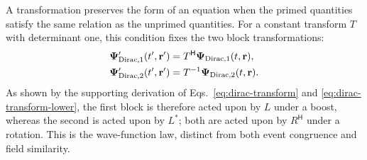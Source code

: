 \documentclass[10pt,letterpaper]{article}
\let\STAamsmathtext\text
\newcommand{\eqtext}[1]{\STAamsmathtext{\normalfont\rmfamily #1}}
\renewcommand{\text}[1]{\STAamsmathtext{\normalfont\rmfamily #1}}
\newcommand{\pv}[1]{#1}
\newcommand{\vct}[1]{\mathbf{#1}}
\newcommand{\bPsi}{\pv{\bm{\Psi}}}
\newcommand{\Hop}{\mathsf H}
\newcommand{\conj}[1]{#1^{*}}
\begin{document}
A transformation preserves the form of an equation when the primed
quantities satisfy the same relation as the unprimed quantities. For a
constant transform \(\pv{T}\) with determinant one, this condition fixes the
two block transformations:
\begin{align}
\bPsi_{\eqtext{Dirac},1}'(t',\vct{r}')
&=\pv{T}^{\Hop}\bPsi_{\eqtext{Dirac},1}(t,\vct{r}),
\label{eq:dirac-transform}\\
\bPsi_{\eqtext{Dirac},2}'(t',\vct{r}')
&=\pv{T}^{-1}\bPsi_{\eqtext{Dirac},2}(t,\vct{r}).
\label{eq:dirac-transform-lower}
\end{align}
As shown by the supporting derivation of
Eqs.\ \eqref{eq:dirac-transform} and \eqref{eq:dirac-transform-lower}, the
first block is therefore acted upon by \(\pv{L}\) under a boost, whereas the
second is acted upon by \(\conj{\pv{L}}\); both are acted upon by
\(\pv{R}^{\Hop}\) under a rotation. This is the wave-function law, distinct from
both event congruence and field similarity.
\end{document}
